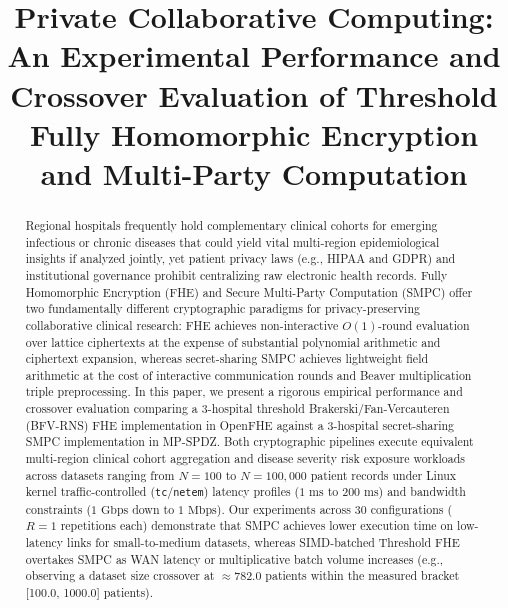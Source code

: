 \documentclass[conference]{IEEEtran}
\begin{document}
\title{Private Collaborative Computing: An Experimental Performance and Crossover Evaluation of Threshold Fully Homomorphic Encryption and Multi-Party Computation}

\author{
}

\maketitle

\begin{abstract}
Regional hospitals frequently hold complementary clinical cohorts for emerging infectious or chronic diseases that could yield vital multi-region epidemiological insights if analyzed jointly, yet patient privacy laws (e.g., HIPAA and GDPR) and institutional governance prohibit centralizing raw electronic health records. Fully Homomorphic Encryption (FHE) and Secure Multi-Party Computation (SMPC) offer two fundamentally different cryptographic paradigms for privacy-preserving collaborative clinical research: FHE achieves non-interactive $O(1)$-round evaluation over lattice ciphertexts at the expense of substantial polynomial arithmetic and ciphertext expansion, whereas secret-sharing SMPC achieves lightweight field arithmetic at the cost of interactive communication rounds and Beaver multiplication triple preprocessing. In this paper, we present a rigorous empirical performance and crossover evaluation comparing a 3-hospital threshold Brakerski/Fan-Vercauteren (BFV-RNS) FHE implementation in OpenFHE against a 3-hospital secret-sharing SMPC implementation in MP-SPDZ. Both cryptographic pipelines execute equivalent multi-region clinical cohort aggregation and disease severity risk exposure workloads across datasets ranging from $N=100$ to $N=100,000$ patient records under Linux kernel traffic-controlled (\texttt{tc}/\texttt{netem}) latency profiles ($1\text{ ms}$ to $200\text{ ms}$) and bandwidth constraints ($1\text{ Gbps}$ down to $1\text{ Mbps}$). Our experiments across 30 configurations ($R=1$ repetitions each) demonstrate that SMPC achieves lower execution time on low-latency links for small-to-medium datasets, whereas SIMD-batched Threshold FHE overtakes SMPC as WAN latency or multiplicative batch volume increases (e.g., observing a dataset size crossover at $\approx 782.0$ patients within the measured bracket [100.0, 1000.0] patients).
\end{abstract}
\end{document}
